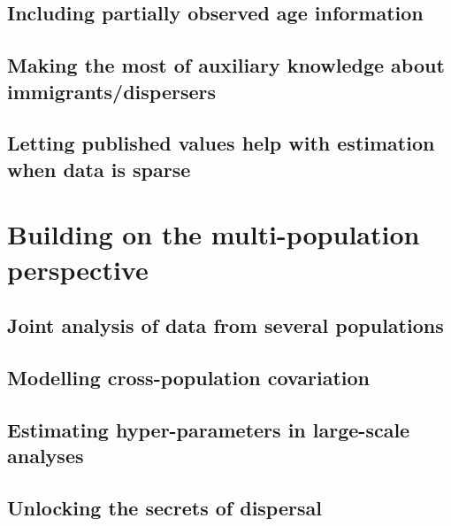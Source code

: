 \documentclass[
]{book}
\begin{document}
\hypertarget{including-partially-observed-age-information}{%
\subsection{Including partially observed age information}\label{including-partially-observed-age-information}}

\hypertarget{making-the-most-of-auxiliary-knowledge-about-immigrantsdispersers}{%
\subsection{Making the most of auxiliary knowledge about immigrants/dispersers}\label{making-the-most-of-auxiliary-knowledge-about-immigrantsdispersers}}

\hypertarget{letting-published-values-help-with-estimation-when-data-is-sparse}{%
\subsection{Letting published values help with estimation when data is sparse}\label{letting-published-values-help-with-estimation-when-data-is-sparse}}

\hypertarget{building-on-the-multi-population-perspective}{%
\section{Building on the multi-population perspective}\label{building-on-the-multi-population-perspective}}

\hypertarget{joint-analysis-of-data-from-several-populations}{%
\subsection{Joint analysis of data from several populations}\label{joint-analysis-of-data-from-several-populations}}

\hypertarget{modelling-cross-population-covariation}{%
\subsection{Modelling cross-population covariation}\label{modelling-cross-population-covariation}}

\hypertarget{estimating-hyper-parameters-in-large-scale-analyses}{%
\subsection{Estimating hyper-parameters in large-scale analyses}\label{estimating-hyper-parameters-in-large-scale-analyses}}

\hypertarget{unlocking-the-secrets-of-dispersal}{%
\subsection{Unlocking the secrets of dispersal}\label{unlocking-the-secrets-of-dispersal}}

  
\end{document}
